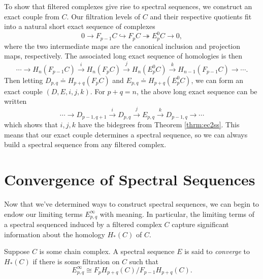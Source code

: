 \documentclass[twoside,10pt]{article}
\begin{document}
To show that filtered complexes give rise to spectral sequences, we construct an exact couple from $C$. Our filtration levels of $C$ and their respective quotients fit into a natural short exact sequence of complexes
\[
0 \to  F_{p-1}C \hookrightarrow F_{p}C \twoheadrightarrow E_{p}^{0}C \to 0,
\] where the two intermediate maps are the canonical inclusion and projection maps, respectively. The associated long exact sequence of homologies is then
\[
	\cdots \to H_{n}(F_{p-1}C) \stackrel{i}{\to }  H_{n}(F_{p}C) \stackrel{j}{\to }  H_{n}(E_{p}^{0}C) \stackrel{k}{\to }  H_{n-1}(F_{p-1}C) \to \cdots.
\] 
Then letting $D_{p,q} \doteq H_{p+q}(F_{p}C)$ and $E_{p,q} \doteq H_{p+q}(E_{p}^{0}C)$, we can form an exact couple $(D, E, i, j, k)$. For $p+q=n$, the above long exact sequence can be written
\[
	\cdots \to D_{p-1,q+1} \stackrel{i}{\to } D_{p,q} \stackrel{j}{\to } E_{p,q} \stackrel{k}{\to } D_{p-1,q} \to \cdots
\] which shows that $i,j,k$ have the bidegrees from Theorem \ref{thrm:ec2ss}. This means that our exact couple determines a spectral sequence, so we can always build a spectral sequence from any filtered complex.



\section{Convergence of Spectral Sequences}

Now that we've determined ways to construct spectral sequences, we can begin to endow our limiting terms $E_{p,q}^{\infty}$ with meaning. In particular, the limiting terms of a spectral sequenced induced by a filtered complex $C$ capture significant information about the homology $H_*(C)$ of $C$.

\begin{defn}[]
	Suppose $C$ is some chain complex. A spectral sequence $E$ is said to \textit{converge} to $H_*(C)$ if there is some filtration on $C$ such that
	\[
		E_{p,q}^{\infty} \cong F_{p}H_{p+q}(C) / F_{p-1} H_{p+q}(C).
	\] 
\end{defn}
\end{document}
